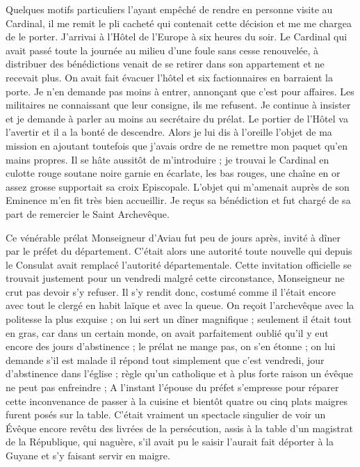 \documentclass[11pt,a4paper]{report}
\begin{document}
Quelques motifs particuliers l'ayant empêché de rendre en personne visite au Cardinal, il me remit le pli cacheté qui contenait cette décision et me me chargea de le porter. J'arrivai à l'Hôtel de l'Europe à six heures du soir. Le Cardinal qui avait passé toute la journée au milieu d'une foule sans cesse renouvelée, à distribuer des bénédictions venait de se retirer dans son appartement et ne recevait plus. On avait fait évacuer l'hôtel et six factionnaires en barraient la porte. Je n'en demande pas moins à entrer, annonçant que c'est pour affaires. Les militaires ne connaissant que leur consigne, ils me refusent. Je continue à insister et je demande à parler au moins au secrétaire du prélat. Le portier de l'Hôtel va l'avertir et il a la bonté de descendre. Alors je lui dis à l'oreille l'objet de ma mission en ajoutant toutefois que j'avais ordre de ne remettre mon paquet qu'en mains propres. Il se hâte aussitôt de m'introduire ; je trouvai le Cardinal en culotte rouge soutane noire garnie en écarlate, les bas rouges, une chaîne en or assez grosse supportait sa croix Episcopale. L'objet qui m'amenait auprès de son Eminence m'en fit très bien accueillir. Je reçus sa bénédiction et fut chargé de sa part de remercier le Saint Archevêque.

Ce vénérable prélat Monseigneur d'Aviau fut peu de jours après, invité à dîner par le préfet du département. C'était alors une autorité toute nouvelle qui depuis le Consulat avait remplacé l'autorité départementale. Cette invitation officielle se trouvait justement pour un vendredi malgré cette circonstance, Monseigneur ne crut pas devoir s'y refuser. Il s'y rendit donc, costumé comme il l'était encore avec tout le clergé en habit laïque et avec la queue. On reçoit l'archevêque avec la politesse la plus exquise ; on lui sert un dîner magnifique ; seulement il était tout en gras, car dans un certain monde, on avait parfaitement oublié qu'il y eut encore des jours d'abstinence ; le prélat ne mange pas, on s'en étonne ; on lui demande s'il est malade il répond tout simplement que c'est vendredi, jour d'abstinence dans l'église ; règle qu'un catholique et à plus forte raison un évêque ne peut pas enfreindre ; A l'instant l'épouse du préfet s'empresse pour réparer cette inconvenance de passer à la cuisine et bientôt quatre ou cinq plats maigres furent posés sur la table. C'était vraiment un spectacle singulier de voir un Évêque encore revêtu des livrées de la persécution, assis à la table d'un magistrat de la République, qui naguère, s'il avait pu le saisir l'aurait fait déporter à la Guyane et s'y faisant servir en maigre.
\end{document}
